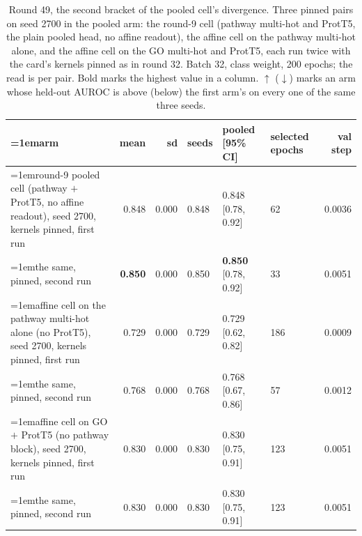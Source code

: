 \begin{table}[H]
  \centering
  \scriptsize
  \setlength{\tabcolsep}{2.5pt}
  \caption[Round 49, the second bracket of the pooled cell's divergence]{Round 49, the second bracket of the pooled cell's divergence. Three pinned pairs on seed 2700 in the pooled arm: the round-9 cell (pathway multi-hot and ProtT5, the plain pooled head, no affine readout), the affine cell on the pathway multi-hot alone, and the affine cell on the GO multi-hot and ProtT5, each run twice with the card's kernels pinned as in round 32. Batch 32, class weight, 200 epochs; the read is per pair. Bold marks the highest value in a column. $\uparrow$ ($\downarrow$) marks an arm whose held-out AUROC is above (below) the first arm's on every one of the same three seeds.}
  \label{tab:w65}
  \begin{tabular}{@{}>{\raggedright\hangindent=1em\hangafter=1\arraybackslash}p{99.6mm}rrlllr@{}}
    \hline
    arm & mean & sd & seeds & pooled [95\% CI] & selected epochs & val step \\
    \hline
    round-9 pooled cell (pathway $+$ ProtT5, no affine readout), seed 2700, kernels pinned, first run & 0.848 & 0.000 & 0.848 & 0.848 [0.78, 0.92] & 62 & 0.0036 \\
    the same, pinned, second run & \textbf{0.850} & 0.000 & 0.850 & \textbf{0.850} [0.78, 0.92] & 33 & 0.0051 \\
    affine cell on the pathway multi-hot alone (no ProtT5), seed 2700, kernels pinned, first run & 0.729 & 0.000 & 0.729 & 0.729 [0.62, 0.82] & 186 & 0.0009 \\
    the same, pinned, second run & 0.768 & 0.000 & 0.768 & 0.768 [0.67, 0.86] & 57 & 0.0012 \\
    affine cell on GO $+$ ProtT5 (no pathway block), seed 2700, kernels pinned, first run & 0.830 & 0.000 & 0.830 & 0.830 [0.75, 0.91] & 123 & 0.0051 \\
    the same, pinned, second run & 0.830 & 0.000 & 0.830 & 0.830 [0.75, 0.91] & 123 & 0.0051 \\
    \hline
  \end{tabular}
\end{table}
